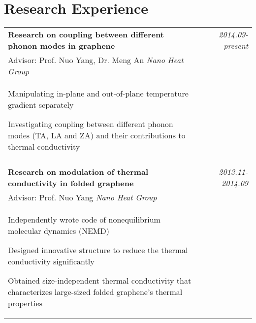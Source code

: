 \documentclass[a4paper,10pt]{article}
\begin{document}
\section{Research Experience}
\begin{tabular}{p{13.5cm}p{0.5cm}r}
\textbf{Research on coupling between different phonon modes in graphene} && \emph{2014.09-present} \\
\hspace{1em} Advisor: Prof. Nuo Yang, Dr. Meng An \hspace{3em} \emph{Nano Heat Group} && \vspace{-0.5em}\\
\begin{compactitem}
       \item Manipulating in-plane and out-of-plane temperature gradient separately\vspace{0.2em}
       \item Investigating coupling between different phonon modes (TA, LA and ZA) and their contributions to thermal conductivity\vspace{0.2em}
     \end{compactitem}&&\vspace{-2.2em} \\
\multicolumn{3}{c}{} \\
\textbf{Research on modulation of thermal conductivity in folded graphene} && \emph{2013.11-2014.09} \\
\hspace{1em} Advisor: Prof. Nuo Yang \hspace{9em} \emph{Nano Heat Group} && \vspace{-0.5em}\\
\begin{compactitem}
       \item Independently wrote code of nonequilibrium molecular dynamics (NEMD)\vspace{0.2em}
       \item Designed innovative structure to reduce the thermal conductivity significantly\vspace{0.2em}
       \item Obtained size-independent thermal conductivity that characterizes large-sized folded graphene's thermal properties
     \end{compactitem}&&\vspace{-2.2em} \\

\end{tabular}
\end{document}

